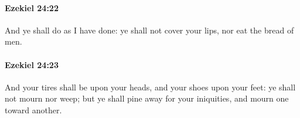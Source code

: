 		\paragraph{Ezekiel 24:22} %
			\label{EZEKIEL-24-22}

			And ye shall do as I have done: ye shall not cover your lips, nor eat the bread of men.


		\paragraph{Ezekiel 24:23} %
			\label{EZEKIEL-24-23}

			And your tires shall be upon your heads, and your shoes upon your feet: ye shall not mourn nor weep; but ye shall pine away for your iniquities, and mourn one toward another.


